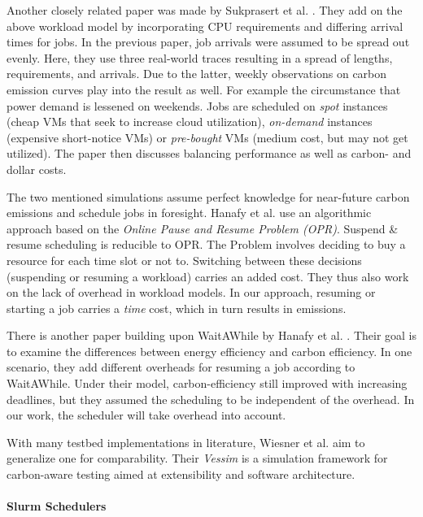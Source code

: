 Another closely related paper was made by Sukprasert et al. \cite{sukprasert_limitations_2024}.
They add on the above workload model by incorporating CPU requirements and differing arrival times for jobs. In the previous paper, job arrivals were assumed to be spread out evenly. 
Here, they use three real-world traces resulting in a spread of lengths, requirements, and arrivals. 
Due to the latter, weekly observations on carbon emission curves play into the result as well. 
For example the circumstance that power demand is lessened on weekends.
Jobs are scheduled on \emph{spot} instances (cheap VMs that seek to increase cloud utilization), \emph{on-demand} instances (expensive short-notice VMs) or \emph{pre-bought} VMs (medium cost, but may not get utilized).
The paper then discusses balancing performance as well as carbon- and dollar costs. 

The two mentioned simulations assume perfect knowledge for near-future carbon emissions and schedule jobs in foresight. 
Hanafy et al. \cite{lechowicz_online_2023} use an algorithmic approach based on the \emph{Online Pause and Resume Problem (OPR)}. 
Suspend \& resume scheduling is reducible to OPR. 
The Problem involves deciding to buy a resource for each time slot or not to. 
Switching between these decisions (suspending or resuming a workload) carries an added cost. 
They thus also work on the lack of overhead in workload models. 
In our approach, resuming or starting a job carries a \emph{time} cost, which in turn results in emissions.

There is another paper building upon WaitAWhile by Hanafy et al. \cite{hanafy_war_2023}. 
Their goal is to examine the differences between energy efficiency and carbon efficiency. 
In one scenario, they add different overheads for resuming a job according to WaitAWhile. 
Under their model, carbon-efficiency still improved with increasing deadlines, but they assumed the scheduling to be independent of the overhead.
In our work, the scheduler will take overhead into account.

With many testbed implementations in literature, Wiesner et al. \cite{wiesner_vessim_2024} aim to generalize one for comparability. Their \emph{Vessim} is a simulation framework for carbon-aware testing aimed at extensibility and software architecture.

\paragraph{Slurm Schedulers}

